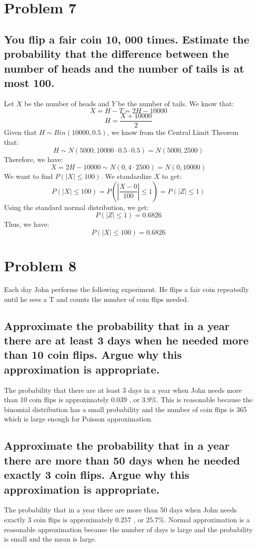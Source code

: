 \documentclass{article}
\theoremstyle{plain} %
\theoremstyle{definition} %
\begin{document}
\section*{Problem 7}
\subsection*{You flip a fair coin 10, 000 times. Estimate the
probability that the difference between the number of heads and the number of tails
is at most 100.}
Let $X$ be the number of heads and $Y$ be the number of tails. We know that:
\[
    X = H - T = 2H - 10000
\]
\[
    H = \frac{X + 10000}{2}
\]
Given that $H \sim Bin(10000, 0.5)$, we know from the Central Limit Theorem that:
\[
    H \sim N(5000, 10000 \cdot 0.5 \cdot 0.5) = N(5000, 2500)
\]
Therefore, we have:
\[
    X = 2H - 10000 \sim N(0, 4 \cdot 2500) = N(0, 10000)
\]
We want to find $P(|X| \leq 100)$.
We standardize $X$ to get:
\[
    P(|X| \leq 100) = P(|\frac{X-0}{100}| \leq 1) = P(|Z| \leq 1)
\]
Using the standard normal distribution, we get:
\[
    P(|Z| \leq 1) = 0.6826
\]
Thus, we have:
\[
    P(|X| \leq 100) = \boxed{0.6826}
\]

\section*{Problem 8}
Each day John performs the following experiment. He flips a fair coin repeatedly until he sees a T and counts the number of coin flips needed.
\subsection*{Approximate the probability that in a year there are at least 3 days when he needed more than 10 coin flips. Argue why this approximation is appropriate.}
The probability that there are at least 3 days in a year when John needs more than 10 coin flips is approximately $\boxed{0.039 \text{ , or } 3.9\%}$.
This is reasonable because the binomial distribution has a small probability and the number of coin flips is 365 which is large enough for Poisson approximation.

\subsection*{Approximate the probability that in a year there are more than 50 days when he
needed exactly 3 coin flips. Argue why this approximation is appropriate.}
The probability that in a year there are more than 50 days when John needs exactly 3 coin flips is approximately $\boxed{0.257 \text{ , or } 25.7\%}$.
Normal approximation is a reasonable approximation because the number of days is large and the probability is small and the mean is large.
\end{document}
